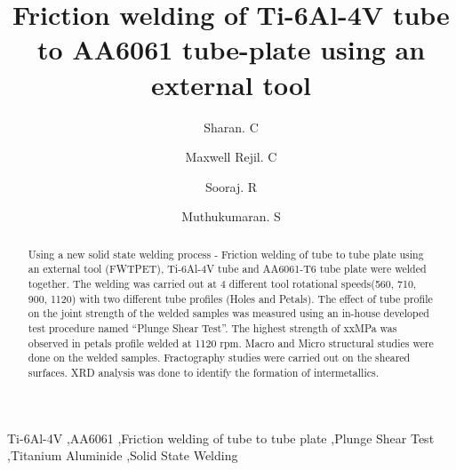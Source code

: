 \documentclass[3p]{elsarticle}
\begin{document}
\newcommand{\degree}{\ensuremath{^{\circ}}}  %


\begin{frontmatter}

\title{Friction welding of Ti-6Al-4V tube to AA6061 tube-plate using an external tool}

\author[META]{Sharan. C}
\author[META]{Maxwell Rejil. C}
\author[META]{Sooraj. R}
\author[META]{Muthukumaran. S}


\address[META]{Department of Metallurgical and Materials Engineering, National Institute of Technology, Tiruchirappalli-620015, India}
         
\begin{abstract}
Using a new solid state welding process - Friction welding of tube to tube plate using an external tool (FWTPET), Ti-6Al-4V tube and AA6061-T6 tube plate were welded together. The welding was carried out at 4 different tool rotational speeds(560, 710, 900, 1120) with two different tube profiles (Holes and Petals). The effect of tube profile on the joint strength of the welded samples was measured using an in-house developed test procedure named ``Plunge Shear Test''. The highest strength of xxMPa was observed in petals profile welded at 1120 rpm. Macro and Micro structural studies were done on the welded samples. Fractography studies were carried out on the sheared surfaces. XRD analysis was done to identify the formation of intermetallics.
\end{abstract}

\begin{keyword}
Ti-6Al-4V \sep AA6061 \sep Friction welding of tube to tube plate \sep Plunge Shear Test \sep Titanium Aluminide \sep  Solid State Welding
\end{keyword}

\end{frontmatter}

\end{document}
